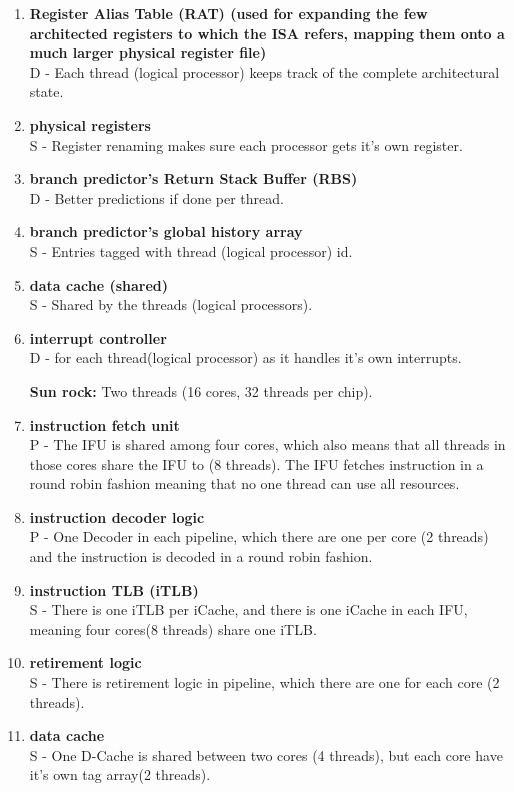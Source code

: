 \documentclass[a4paper]{article}
\begin{document}
\begin{enumerate}
\item
\textbf{Register Alias Table (RAT) (used for expanding the few architected registers to which the ISA refers, mapping them onto a much larger physical register file)\\}
D - Each thread (logical processor) keeps track of the complete architectural state.    
\item
\textbf{physical registers\\}
S - Register renaming makes sure each processor gets it’s own register.
\item
\textbf{branch predictor’s Return Stack Buffer (RBS)\\}
D - Better predictions if done per thread.
\item
\textbf{branch predictor’s global history array\\}
S - Entries tagged with thread (logical processor) id.
\item
\textbf{data cache (shared)\\}
S - Shared by the threads (logical processors).
\item
\textbf{interrupt controller\\}
D - for each thread(logical processor) as it handles it’s own interrupts.

\textbf{Sun rock:} Two threads (16 cores, 32 threads per chip).  
\item
\textbf{instruction fetch unit\\}
P - The IFU is shared among four cores, which also means that all threads in those cores share the IFU to (8 threads). The IFU fetches instruction in a round robin fashion meaning that no one thread can use all resources.

\item
\textbf{instruction decoder logic\\}
P - One Decoder in each pipeline, which there are one per core (2 threads) and the instruction is decoded in a round robin fashion. 

\item
\textbf{instruction TLB (iTLB)\\}
S - There is one iTLB per iCache, and there is one iCache in each IFU, meaning four cores(8 threads) share one iTLB.

\item
\textbf{retirement logic\\}
S - There is retirement logic in pipeline, which there are one for each core (2 threads).

\item
\textbf{data cache\\}
S - One D-Cache is shared between two cores (4 threads), but each core have it's own tag array(2 threads).


\end{enumerate}
\end{document}

